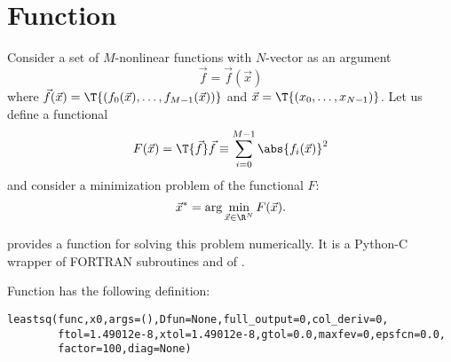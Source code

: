 

\section{Function }

Consider a set of $M$-nonlinear functions with $N$-vector as an argument
\begin{displaymath}
\vec f=\vec f(\vec x)
\end{displaymath}
where $\vec f(\vec x)=\T{(f_0(\vec x),\ldots,f_{M-1}(\vec x))}$ and
$\vec x=\T{(x_0,\ldots,x_{N-1})}$.
Let us define a functional
\begin{displaymath}
F(\vec x)=\T{\vec f}\vec f\equiv\sum_{i=0}^{M-1} \abs{f_i(\vec x)}^2
\end{displaymath}
and consider a minimization problem of the functional $F$:
\begin{displaymath}
\vec x^*=\arg \min_{\vec x\in\R^N} F(\vec x).
\end{displaymath}

 provides a function  for solving this
problem numerically. It is a Python-C wrapper of FORTRAN subroutines
 and  of .

Function  has the following definition:
\begin{verbatim}
leastsq(func,x0,args=(),Dfun=None,full_output=0,col_deriv=0,
        ftol=1.49012e-8,xtol=1.49012e-8,gtol=0.0,maxfev=0,epsfcn=0.0,
        factor=100,diag=None)
\end{verbatim}

